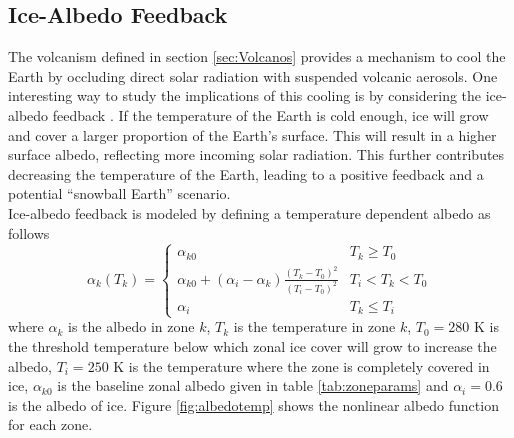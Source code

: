 \documentclass[12pt]{article}
\begin{document}
\subsection{Ice-Albedo Feedback} \label{sec:Ice}
The volcanism defined in section \ref{sec:Volcanos} provides a mechanism to
cool the Earth by occluding direct solar radiation with suspended volcanic
aerosols. One interesting way to study the implications of this cooling is by
considering the ice-albedo feedback \parencite{budyko_albedo}. If the temperature
of the Earth is cold enough, ice will grow and cover a larger proportion of the
Earth's surface. This will result in a higher surface albedo, reflecting more
incoming solar radiation. This further contributes decreasing the temperature of
the Earth, leading to a positive feedback and a potential ``snowball Earth'' scenario.\\

Ice-albedo feedback is modeled by defining a temperature dependent albedo as follows
\begin{equation} \label{eqn:albedoparam}
    \alpha_k(T_k) =
      \begin{cases}
      \alpha_{k0} & T_k \geq T_0 \\
      \alpha_{k0} + (\alpha_i-\alpha_k)\frac{(T_k-T_0)^2}{(T_i-T_0)^2}
      & T_i < T_k < T_0 \\
      \alpha_i & T_k \leq T_i
      \end{cases}
\end{equation}
where $\alpha_k$ is the albedo in zone $k$, $T_k$ is the temperature in
zone $k$, $T_0 = 280$ K is the threshold temperature below which
zonal ice cover will grow to increase the albedo, $T_i = 250$ K is the temperature
where the zone is completely covered in ice, $\alpha_{k0}$ is the baseline
zonal albedo given in table \ref{tab:zoneparams} and $\alpha_i = 0.6$ is the
albedo of ice. Figure \ref{fig:albedotemp} shows the nonlinear albedo function
for each zone.
\end{document}
